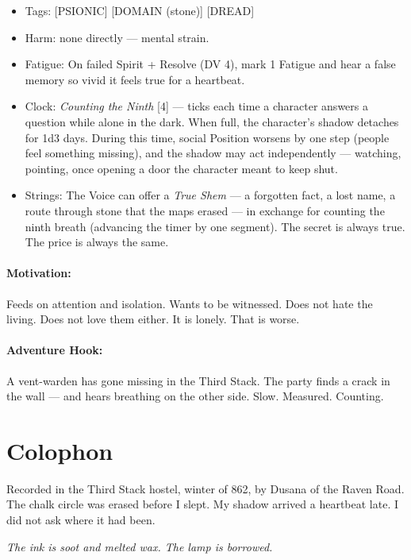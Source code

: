 \begin{itemize}
\item Tags: [PSIONIC] [DOMAIN (stone)] [DREAD]
\item Harm: none directly --- mental strain.
\item Fatigue: On failed Spirit + Resolve (DV 4), mark 1 Fatigue and hear a false memory so vivid it feels true for a heartbeat.
\item Clock: \textit{Counting the Ninth} [4] --- ticks each time a character answers a question while alone in the dark. When full, the character's shadow detaches for 1d3 days. During this time, social Position worsens by one step (people feel something missing), and the shadow may act independently --- watching, pointing, once opening a door the character meant to keep shut.
\item Strings: The Voice can offer a \textit{True Shem} --- a forgotten fact, a lost name, a route through stone that the maps erased --- in exchange for counting the ninth breath (advancing the timer by one segment). The secret is always true. The price is always the same.
\end{itemize}

\paragraph{Motivation:}

Feeds on attention and isolation. Wants to be witnessed. Does not hate the living. Does not love them either. It is lonely. That is worse.

\paragraph{Adventure Hook:}

A vent-warden has gone missing in the Third Stack. The party finds a crack in the wall --- and hears breathing on the other side. Slow. Measured. Counting.

\section*{Colophon}

Recorded in the Third Stack hostel, winter of 862, by Dusana of the Raven Road. The chalk circle was erased before I slept. My shadow arrived a heartbeat late. I did not ask where it had been.

\noindent \textit{The ink is soot and melted wax. The lamp is borrowed.}
